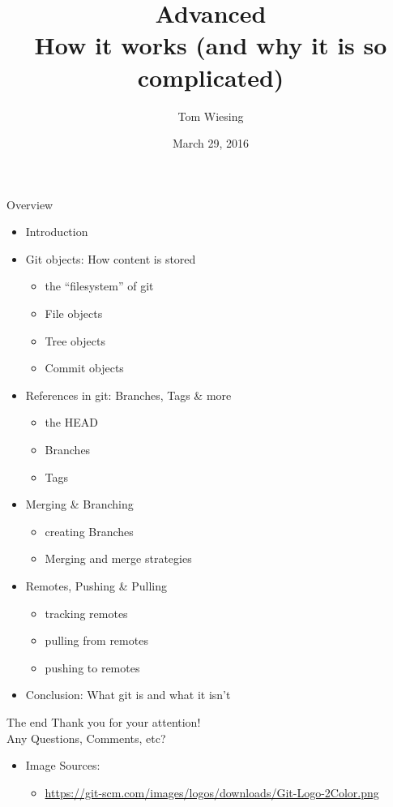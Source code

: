 \documentclass{beamer}
\title{Advanced \logoimage{imgs/git_logo}{40px}\\How it works (and why it is so complicated)}
\author{Tom Wiesing}
\institute{KWARC second hour talk}
\date{March 29, 2016}
\begin{document}
    \frame{\titlepage}
    
    \begin{frame}{Overview}
      \begin{itemize}
          \item Introduction
          
          \item Git objects: How content is stored
          \begin{itemize}
            \item the ``filesystem'' of git
            \item File objects
            \item Tree objects
            \item Commit objects
          \end{itemize}
          
          \item References in git: Branches, Tags \& more
          \begin{itemize}
            \item the HEAD
            \item Branches
            \item Tags
          \end{itemize}
          
          \item Merging \& Branching
          \begin{itemize}
            \item creating Branches
            \item Merging and merge strategies
          \end{itemize}
          
          \item Remotes, Pushing \& Pulling
          \begin{itemize}
            \item tracking remotes
            \item pulling from remotes
            \item pushing to remotes
          \end{itemize}
          
          \item Conclusion: What git is and what it isn't
      \end{itemize}
    \end{frame}

    \begin{frame}{The end}
      {\huge
        Thank you for your attention!\\
        Any Questions, Comments, etc?
      }
      
      \begin{itemize}
        \item Image Sources: 
        \begin{itemize}
          \item \url{https://git-scm.com/images/logos/downloads/Git-Logo-2Color.png}
        \end{itemize}  
      \end{itemize}
    \end{frame}
\end{document}
